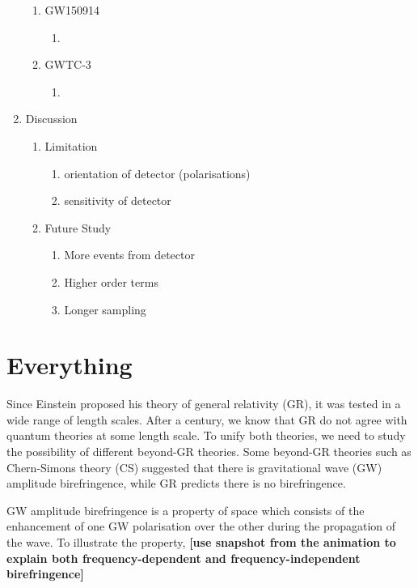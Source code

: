 \documentclass[twocolumn]{aastex631}
\begin{document}
\begin{enumerate}
    \begin{enumerate}
        \item GW150914
        \begin{enumerate}
            \item 
        \end{enumerate}
        \item GWTC-3
        \begin{enumerate}
            \item 
        \end{enumerate}
    \end{enumerate}
    \item Discussion
    \begin{enumerate}
        \item Limitation
        \begin{enumerate}
            \item orientation of detector (polarisations)
            \item sensitivity of detector
        \end{enumerate}
        \item Future Study
        \begin{enumerate}
            \item More events from detector
            \item Higher order terms
            \item Longer sampling
        \end{enumerate}
    \end{enumerate}
\end{enumerate}

\section{Everything}
Since Einstein proposed his theory of general relativity (GR), it was tested in a wide range of length scales.
After a century, we know that GR do not agree with quantum theories at some length scale.
To unify both theories, we need to study the possibility of different beyond-GR theories.
Some beyond-GR theories such as Chern-Simons theory (CS) suggested that there is gravitational wave (GW) amplitude birefringence,
while GR predicts there is no birefringence.

GW amplitude birefringence is a property of space which consists of the enhancement of one GW polarisation over the other during the propagation of the wave.
To illustrate the property, \textbf{[use snapshot from the animation to explain both frequency-dependent and frequency-independent birefringence]}
\end{document}
